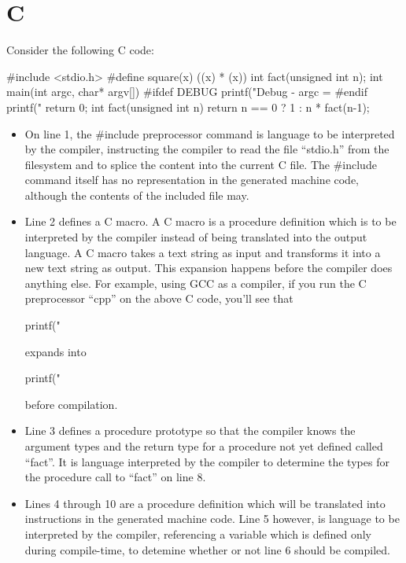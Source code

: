  \section{C}
Consider the following C code:

 \begin{code}
#include <stdio.h>
#define square(x) ((x) * (x))
int fact(unsigned int n);
int main(int argc, char* argv[]){
#ifdef DEBUG
  printf("Debug - argc = %
#endif
 printf("%
  return 0;
}
int fact(unsigned int n){
  return n == 0
    ? 1
    : n * fact(n-1);
}
 \end{code}

 \begin{itemize}
  \item
     On line 1, the \#include preprocessor command
     is language to be interpreted by the compiler,
     instructing the compiler to
     read the file ``stdio.h''
     from the filesystem and to splice the content
     into the current C file.  The \#include command
     itself has no representation in the generated machine code, although the contents
     of the included file may.

  \item
     Line 2 defines a C macro. A C macro is a procedure definition which
     is to be interpreted by the compiler instead of being translated
     into the output language.
     A C macro takes a text
     string as input and transforms it into a new text string as output.
     This expansion happens before the compiler does anything
     else.  For example, using GCC as a compiler, if you run the C preprocessor
     ``cpp'' on the above C code, you'll see that

     \begin{code}
  printf("%
     \end{code}

     \noindent expands into

     \begin{code}
  printf("%
     \end{code}

     \noindent before compilation.

  \item
     Line 3 defines a procedure prototype so that
     the compiler knows the argument types and the return type for a procedure not
     yet defined called ``fact''.
     It is language interpreted by the compiler to determine the types for the procedure
     call to ``fact'' on line 8.
  \item
     Lines 4 through 10 are a procedure definition which will be
     translated into instructions in the generated machine code.  Line 5 however, is language
     to be interpreted by the compiler, referencing a variable which is defined
     only during compile-time, to detemine whether or not line 6 should be
     compiled.
 \end{itemize}

